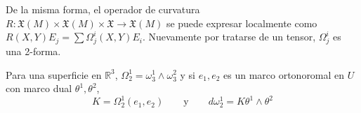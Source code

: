 \documentclass[spanish]{article}
\theoremstyle{definition}
\newcommand{\R}{\mathbb{R}}
\newcommand{\X}{\mathfrak{X}}
\begin{document}
	De la misma forma, el operador de curvatura $R:\X(M)\times\X(M)\times\X\to\X(M)$ se puede expresar localmente como $R(X,Y)E_j=\sum\Omega_j^i(X,Y)E_i$. Nuevamente por tratarse de un tensor, $\Omega_j^i$ es una 2-forma.
	
	Para una superficie en $\R^3$, $\Omega_2^1=\omega_3^1\wedge\omega_3^2$ y si $e_1,e_2$ es un marco ortonoromal en $U$ con marco dual $\theta^1,\theta^2$,
	\[K=\Omega_2^1(e_1,e_2)\qquad\text{y}\qquad d\omega_2^1=K\theta^1\wedge\theta^2\]
	\fi
\end{document}

